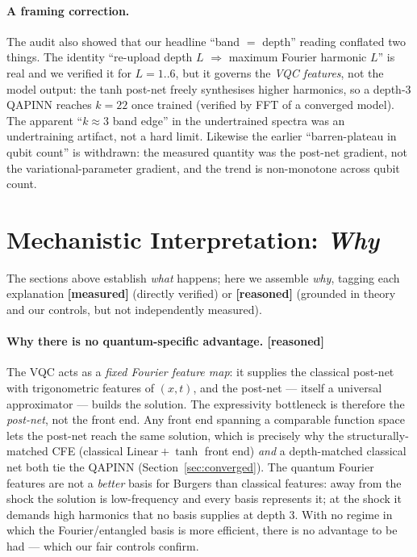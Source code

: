 \documentclass[11pt]{article}
\begin{document}
\paragraph{A framing correction.} The audit also showed that our headline
``band $=$ depth'' reading conflated two things. The identity ``re-upload depth $L$
$\Rightarrow$ maximum Fourier harmonic $L$'' is real and we verified it for $L=1..6$,
but it governs the \emph{VQC features}, not the model output: the tanh post-net
freely synthesises higher harmonics, so a depth-3 QAPINN reaches $k=22$ once
trained (verified by FFT of a converged model). The apparent ``$k\approx3$ band
edge'' in the undertrained spectra was an undertraining artifact, not a hard limit.
Likewise the earlier ``barren-plateau in qubit count'' is withdrawn: the measured
quantity was the post-net gradient, not the variational-parameter gradient, and the
trend is non-monotone across qubit count.

\section{Mechanistic Interpretation: \emph{Why}}\label{sec:why}
The sections above establish \emph{what} happens; here we assemble \emph{why},
tagging each explanation \textbf{[measured]} (directly verified) or \textbf{[reasoned]}
(grounded in theory and our controls, but not independently measured).

\paragraph{Why there is no quantum-specific advantage. [reasoned]} The VQC acts as a
\emph{fixed Fourier feature map}: it supplies the classical post-net with
trigonometric features of $(x,t)$, and the post-net --- itself a universal
approximator --- builds the solution. The expressivity bottleneck is therefore the
\emph{post-net}, not the front end. Any front end spanning a comparable function space
lets the post-net reach the same solution, which is precisely why the
structurally-matched CFE (classical $\mathrm{Linear}+\tanh$ front end) \emph{and} a
depth-matched classical net both tie the QAPINN (Section~\ref{sec:converged}). The
quantum Fourier features are not a \emph{better} basis for Burgers than classical
features: away from the shock the solution is low-frequency and every basis represents
it; at the shock it demands high harmonics that no basis supplies at depth 3. With no
regime in which the Fourier/entangled basis is more efficient, there is no advantage to
be had --- which our fair controls confirm.
\end{document}
